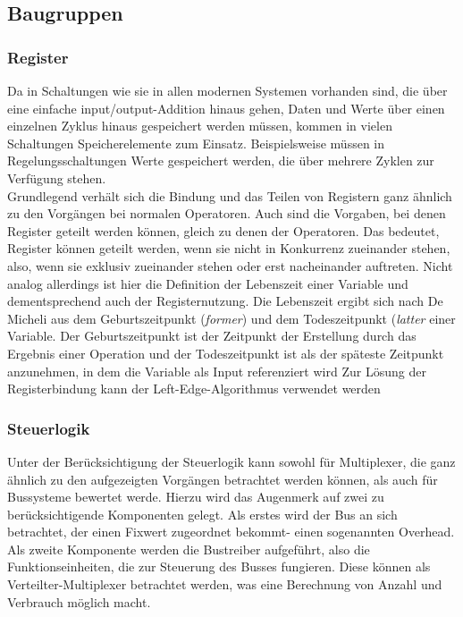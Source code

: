 \documentclass[conference]{IEEEtran}
\begin{document}
\subsection{Baugruppen}
 \subsubsection{Register}
 Da in Schaltungen wie sie in allen modernen Systemen vorhanden sind, die über eine einfache input/output-Addition hinaus gehen, Daten und Werte über einen einzelnen Zyklus hinaus gespeichert werden müssen, kommen in vielen Schaltungen Speicherelemente zum Einsatz. Beispielsweise müssen in Regelungsschaltungen Werte gespeichert werden, die über mehrere Zyklen zur Verfügung stehen. \\
 Grundlegend verhält sich die Bindung und das Teilen von Registern ganz ähnlich zu den Vorgängen bei normalen Operatoren. Auch sind die Vorgaben, bei denen Register geteilt werden können, gleich zu denen der Operatoren. Das bedeutet, Register können geteilt werden, wenn sie nicht in Konkurrenz zueinander stehen, also, wenn sie exklusiv zueinander stehen oder erst nacheinander auftreten. Nicht analog allerdings ist hier die Definition der Lebenszeit einer Variable und dementsprechend auch der Registernutzung. Die Lebenszeit ergibt sich nach De Micheli aus dem Geburtszeitpunkt (\textit{former})  und dem Todeszeitpunkt (\textit{latter} einer Variable. Der Geburtszeitpunkt ist der Zeitpunkt der Erstellung durch das Ergebnis einer Operation und der Todeszeitpunkt ist als der späteste Zeitpunkt anzunehmen, in dem die Variable als Input referenziert wird\cite[S. 240]{3}
Zur Lösung der Registerbindung kann der Left-Edge-Algorithmus verwendet werden \cite[S. 359]{2}\\
 \subsubsection{Steuerlogik}
 Unter der Berücksichtigung der Steuerlogik kann sowohl für Multiplexer, die ganz ähnlich zu den aufgezeigten Vorgängen betrachtet werden können, als auch für Bussysteme bewertet werde. Hierzu wird das Augenmerk auf zwei zu berücksichtigende Komponenten gelegt. Als erstes wird der Bus an sich betrachtet, der einen Fixwert zugeordnet bekommt- einen sogenannten Overhead.
Als zweite Komponente werden die Bustreiber aufgeführt, also die Funktionseinheiten, die zur Steuerung des Busses fungieren. Diese können als Verteilter-Multiplexer betrachtet werden, was eine Berechnung von Anzahl und Verbrauch möglich macht.\cite[S. 157]{3}\\
\end{document}

